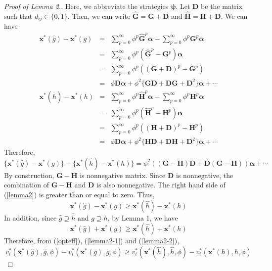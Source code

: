 \documentclass[12pt]{article}
\theoremstyle{definition}
\newcommand{\bm}[1]{\boldsymbol{#1}}
\begin{document}
\begin{proof}[Proof of Lemma 2.]
	Here, we abbreviate the strategies $\bm{\psi}$.
	Let $\bm{D}$ be the matrix such that $d_{ij} \in \{0,1\}$.
	Then, we can write $\bm{\hat{G}} = \bm{G} + \bm{D}$ and $\bm{\hat{H}} = \bm{H} + \bm{D}$.
	We can have
	\begin{eqnarray*}
		\bm{x}^*(\hat{g}) - \bm{x}^*(g)
			&=& \sum_{p=0}^{\infty} \phi^p \bm{\hat{G}}^p \bm{\alpha} - \sum_{p=0}^{\infty} \phi^p \bm{G}^p \bm{\alpha} \\
			&=& \sum_{p=0}^{\infty} \phi^p (\bm{\hat{G}}^p - \bm{G}^p) \bm{\alpha} \\
			&=& \sum_{p=0}^{\infty} \phi^p ({(\bm{G} + \bm{D})}^p - \bm{G}^p) \\
			&=& \phi \bm{D} \bm{\alpha} + \phi^2 \{ \bm{G} \bm{D} + \bm{D} \bm{G} + \bm{D}^2 \} \bm{\alpha} + \cdots \\
		\bm{x}^*(\hat{h}) - \bm{x}^*(h)
			&=& \sum_{p=0}^{\infty} \phi^p \bm{\hat{H}}^p \bm{\alpha} - \sum_{p=0}^{\infty} \phi^p \bm{H}^p \bm{\alpha} \\
			&=& \sum_{p=0}^{\infty} \phi^p (\bm{\hat{H}}^p - \bm{H}^p) \bm{\alpha} \\
			&=& \sum_{p=0}^{\infty} \phi^p ({(\bm{H} + \bm{D})}^p - \bm{H}^p) \\
			&=& \phi \bm{D} \bm{\alpha} + \phi^2 \{ \bm{H} \bm{D} + \bm{D} \bm{H} + \bm{D}^2 \} \bm{\alpha} + \cdots
	\end{eqnarray*}
	Therefore,
	\begin{equation}
		\label{lemma2}
		\{ \bm{x}^*(\hat{g}) - \bm{x}^*(g) \} - \{ \bm{x}^*(\hat{h}) - \bm{x}^*(h) \} = \phi^2 ((\bm{G} - \bm{H}) \bm{D} + \bm{D} (\bm{G} - \bm{H})) \bm{\alpha} + \cdots
	\end{equation}
	By construction, $\bm{G} - \bm{H}$ is nonnegative matrix.
	Since $\bm{D}$ is nonnegative, the combination of $\bm{G} - \bm{H}$ and $\bm{D}$ is also nonnegative.
	The right hand side of (\ref{lemma2}) is greater than or equal to zero.
	Thus,
	\begin{equation}
		\label{lemma2-1}
		\bm{x}^*(\hat{g}) - \bm{x}^*(g) \ge \bm{x}^*(\hat{h}) - \bm{x}^*(h)
	\end{equation}
	In addition, since $\hat{g} \supseteq \hat{h}$ and $g \supseteq h$, by Lemma 1, we have
	\begin{equation}
		\label{lemma2-2}
		\bm{x}^*(\hat{g}) + \bm{x}^*(g) \ge \bm{x}^*(\hat{h}) + \bm{x}^*(h)
	\end{equation}
	Therefore, from (\ref{opteff}), (\ref{lemma2-1}) and (\ref{lemma2-2}),
	\[ v_i^*(\bm{x}^*(\hat{g}), \hat{g}, \phi) - v_i^*(\bm{x}^*(g), g, \phi) \ge v_i^*(\bm{x}^*(\hat{h}), \hat{h}, \phi) - v_i^*(\bm{x}^*(h), h, \phi)\]
\end{proof}
\end{document}
